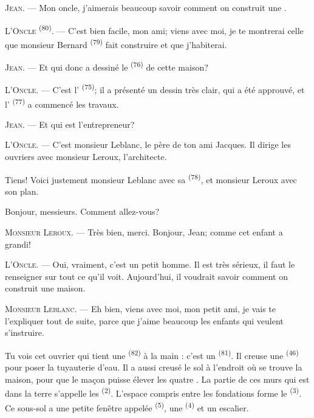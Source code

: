 \textsc{Jean}. --- Mon oncle, j'aimerais beaucoup savoir comment on construit
une .

\textsc{L'Oncle} \textsuperscript{(80)}. --- C'est bien facile, mon ami; viens
avec moi, je te montrerai celle que monsieur Bernard \textsuperscript{(79)}
fait construire et que j'habiterai.

\textsc{Jean}. --- Et qui donc a dessiné le  \textsuperscript{(76)}
de cette maison?

\textsc{L'Oncle}. --- C'est l' \textsuperscript{(75)}; il a
présenté un dessin très clair, qui a été approuvé, et
l' \textsuperscript{(77)} a commencé les travaux.

\textsc{Jean}. --- Et qui est l'entrepreneur?

\textsc{L'Oncle}. --- C'est monsieur Leblanc, le père de ton ami Jacques. Il
dirige les ouvriers avec monsieur Leroux, l'architecte.

Tiens! Voici justement monsieur Leblanc avec sa 
\textsuperscript{(78)}, et monsieur Leroux avec son plan.

Bonjour, messieurs. Comment allez-vous?

\textsc{Monsieur Leroux}. --- Très bien, merci. Bonjour, Jean; comme cet enfant
a grandi!

\textsc{L'Oncle}. --- Oui, vraiment, c'est un petit homme. Il est très sérieux,
il faut le renseigner sur tout ce qu'il voit. Aujourd'hui, il voudrait savoir
comment on construit une maison.

\VUsaut{3.0mm}

\textsc{Monsieur Leblanc}. --- Eh bien, viens avec moi, mon petit ami, je vais
te l'expliquer tout de suite, parce que j'aime beaucoup les enfants qui veulent
s'instruire.

Tu vois cet ouvrier qui tient une  \textsuperscript{(82)} à la
main : c'est un  \textsuperscript{(81)}. Il creuse une
 \textsuperscript{(46)} pour poser la tuyauterie d'eau. Il a
aussi creusé le sol à l'endroit où se trouve la maison, pour que le maçon puisse
élever les quatre . La partie de ces murs qui est dans la terre
s'appelle les  \textsuperscript{(2)}. L'espace compris entre
les fondations forme le  \textsuperscript{(3)}. Ce sous-sol a
une petite fenêtre appelée  \textsuperscript{(5)}, une
 \textsuperscript{(4)} et un escalier.


